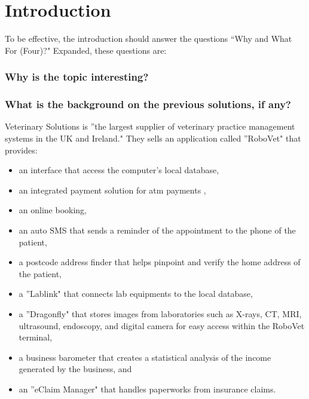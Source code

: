 \documentclass[journal]{./IEEE/IEEEtran}
\title{\SPTITLE}
\author{\ADVISEE~and~\ADVISER%
\REMARK
}
\begin{document}
\maketitle

\begin{abstract}
\end{abstract}

\begin{keywords}
\end{keywords}

\section{Introduction}
To be effective, the introduction should answer the questions ``Why and What For (Four)?" Expanded, these questions are:\cite{Papadakis83}

\subsubsection*{Why is the topic interesting?}

\subsubsection*{What is the background on the previous solutions, if any?}
Veterinary Solutions is ''the largest supplier of veterinary practice management systems in the UK and Ireland."\cite{VetSol} They sells an application called ''RoboVet" that provides:
\begin{itemize}[noitemsep]
\item an interface that access the computer's local database,
\item an integrated payment solution for atm payments ,
\item an online booking,
\item an auto SMS that sends a reminder of the appointment to the phone of the patient,
\item a postcode address finder that helps pinpoint and verify the home address of the patient,
\item a ''Lablink" that connects lab equipments to the local database,
\item a ''Dragonfly" that stores images from laboratories such as X-rays, CT, MRI, ultrasound, endoscopy, and digital camera for easy access within the RoboVet terminal,
\item a business barometer that creates a statistical analysis of the income generated by the business, and
\item an ''eClaim Manager" that handles paperworks from insurance claims.
\end{itemize}
\end{document}
